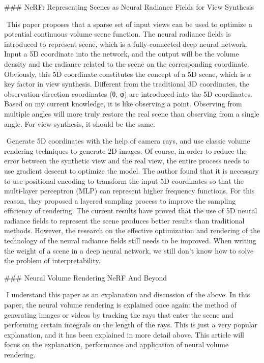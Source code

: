 
### NeRF: Representing Scenes as Neural Radiance Fields for View Synthesis

​	This paper proposes that a sparse set of input views can be used to optimize a potential continuous volume scene function. The neural radiance fields is introduced to represent scene, which is a fully-connected deep neural network. Input a 5D coordinate into the network, and the output will be the volume density and the radiance related to the scene on the corresponding coordinate. Obviously, this 5D coordinate constitutes the concept of a 5D scene, which is a key factor in view synthesis. Different from the traditional 3D coordinates, the observation direction coordinates (θ, φ) are introduced into the 5D coordinates. Based on my current knowledge, it is like observing a point. Observing from multiple angles will more truly restore the real scene than observing from a single angle. For view synthesis, it should be the same.  

​	Generate 5D coordinates with the help of camera rays, and use classic volume rendering techniques to generate 2D images. Of course, in order to reduce the error between the synthetic view and the real view, the entire process needs to use gradient descent to optimize the model. The author found that it is necessary to use positional encoding to transform the input 5D coordinates so that the multi-layer perceptron (MLP) can represent higher frequency functions. For this reason, they proposed a layered sampling process to improve the sampling efficiency of rendering. The current results have proved that the use of 5D neural radiance fields to represent the scene produces better results than traditional methods. However, the research on the effective optimization and rendering of the technology of the neural radiance fields still needs to be improved. When writing the weight of a scene in a deep neural network, we still don't know how to solve the problem of interpretability. 

### Neural Volume Rendering NeRF And Beyond

​	I understand this paper as an explanation and discussion of the above. In this paper, the neural volume rendering is explained once again: the method of generating images or videos by tracking the rays that enter the scene and performing certain integrals on the length of the rays. This is just a very popular explanation, and it has been explained in more detail above. This article will focus on the explanation, performance and application of neural volume rendering.  

